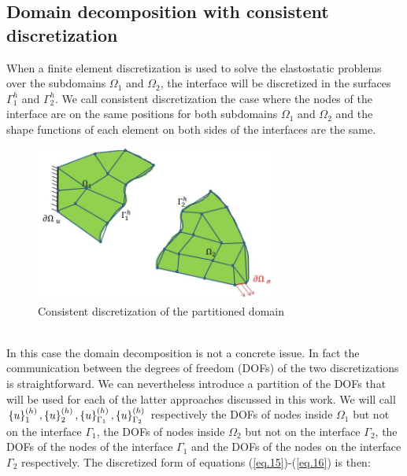  \subsection{Domain decomposition with consistent discretization}\label{ssec31}
 When a finite element discretization is used to solve the elastostatic problems over the subdomains $\Omega_1$ and $\Omega_2$, the interface will be discretized in the surfaces $\Gamma_1^h$ and $\Gamma_2^h$.  
 We call consistent discretization the case where the nodes of the interface are on the same positions for both subdomains $\Omega_1$ and $\Omega_2$ and the shape functions of each element on both sides of the interfaces are the same.
 \begin{figure}[ht]
 \centering
 \includegraphics[width=8cm]{images/Ch1/Consistent_discretization}
 \caption{Consistent discretization of the partitioned domain} 
 \label{fig.3}
 \end{figure}
 \\
 In this case the domain decomposition is not a concrete issue. In fact the communication between the degrees of freedom (DOFs) of the two discretizations is straightforward. We can nevertheless introduce a partition of the DOFs that will be used for each of the latter approaches discussed in this work.
 We will call $\left\lbrace{u}\right \rbrace_1^{(h)},\left\lbrace{u}\right \rbrace_2^{(h)},\left\lbrace{u}\right \rbrace_{\Gamma_1}^{(h)},\left\lbrace{u}\right \rbrace_{\Gamma_2}^{(h)}$ respectively the DOFs of nodes inside $\Omega_1$ but not on the interface $\Gamma_1$, the DOFs of nodes inside $\Omega_2$ but not on the interface $\Gamma_2$, the DOFs of the nodes of the interface $\Gamma_1$ and the DOFs of the nodes on the interface $\Gamma_2$ respectively. The discretized form of equations (\ref{eq.15})-(\ref{eq.16}) is then: 
